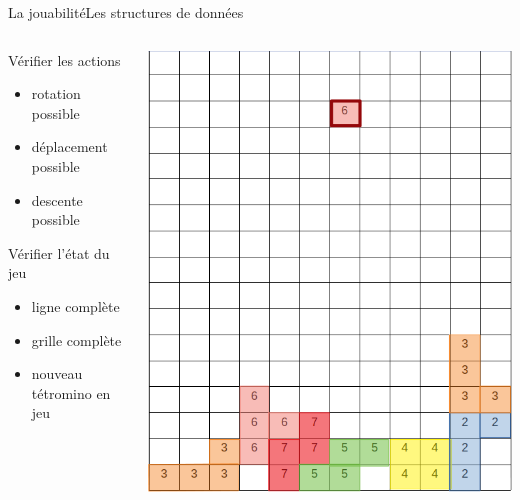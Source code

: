 \documentclass[french]{beamer}
\begin{document}
		
			\begin{frame}{La jouabilité}{Les structures de données}
				\begin{columns}
					\begin{column}{0.6\textwidth}
						\begin{block}{Vérifier les actions}
							\begin{itemize}
								\item rotation possible
								\item déplacement possible
								\item descente possible
							\end{itemize}
						\end{block}

						\begin{block}{Vérifier l'état du jeu}
							\begin{itemize}
								\item ligne complète
								\item grille complète
								\item nouveau tétromino en jeu
							\end{itemize}
						\end{block}
					\end{column}
					\begin{column}{0.3\textwidth}
						\begin{center}
							\includegraphics[scale=0.2]{img/gridNB.png}
						\end{center}
					\end{column}
				\end{columns}
			\end{frame}
\end{document}

